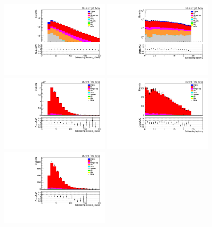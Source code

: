 \begin{figure}[h]
\centering
\includegraphics[width=0.47\textwidth]{figs/background-estimation/plots/unblinded/ttbar_control/lep2Pt_SingleTop_lepSel_emu_log.pdf}
\includegraphics[width=0.47\textwidth]{figs/background-estimation/plots/unblinded/ttbar_control/lep2Eta_SingleTop_lepSel_emu_log.pdf}
\\
\includegraphics[width=0.47\textwidth]{figs/background-estimation/plots/unblinded/ttbar_control/lep2Pt_SingleTop_jetSel_emu.pdf}
\includegraphics[width=0.47\textwidth]{figs/background-estimation/plots/unblinded/ttbar_control/lep2Eta_SingleTop_jetSel_emu.pdf}
\\
\includegraphics[width=0.47\textwidth]{figs/background-estimation/plots/unblinded/ttbar_control/lep2Pt_SingleTop_wMass_emu.pdf}

\end{figure}
